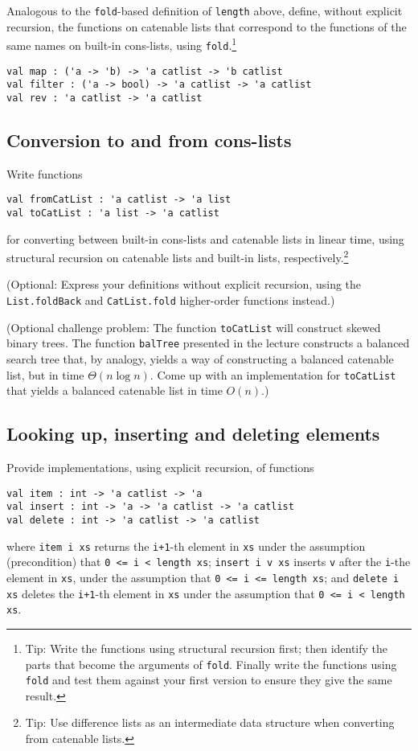 \documentclass[a4paper,11pt]{article}
\begin{document}
Analogous to the \verb|fold|-based definition of \verb|length| above, define, without explicit recursion, the functions on catenable lists that correspond to the functions of the same names on built-in cons-lists, using \verb|fold|.\footnote{Tip: Write the functions using structural recursion first; then identify the parts that become the arguments of \texttt{fold}. Finally write the functions using \texttt{fold} and test them against your first version to ensure they give the same result.}  
\begin{verbatim}
val map : ('a -> 'b) -> 'a catlist -> 'b catlist 
val filter : ('a -> bool) -> 'a catlist -> 'a catlist 
val rev : 'a catlist -> 'a catlist
\end{verbatim}

\subsection{Conversion to and from cons-lists}

Write functions
\begin{verbatim}
val fromCatList : 'a catlist -> 'a list
val toCatList : 'a list -> 'a catlist
\end{verbatim}
for converting between built-in cons-lists and catenable lists in linear time, using structural recursion on catenable lists and built-in lists, respectively.\footnote{Tip: Use difference lists as an intermediate data structure when converting from catenable lists.}

(Optional: Express your definitions without explicit recursion, using the \texttt{List.foldBack} and \texttt{CatList.fold} higher-order functions instead.)

(Optional challenge problem: The function \verb|toCatList| will construct skewed binary trees.  The function \verb|balTree| presented in the lecture constructs a balanced search tree that, by analogy, yields a way of constructing a balanced catenable list, but in time $\Theta(n \log n)$.  Come up with an implementation for \verb|toCatList| that yields a balanced catenable list in time $O(n)$.)

\subsection{Looking up, inserting and deleting elements}

Provide implementations, using explicit recursion, of functions
\begin{verbatim}
val item : int -> 'a catlist -> 'a
val insert : int -> 'a -> 'a catlist -> 'a catlist
val delete : int -> 'a catlist -> 'a catlist
\end{verbatim}
where \verb|item i xs| returns the \verb|i+1|-th element in \verb|xs| under the assumption (precondition) that \verb|0 <= i < length xs|;
\verb|insert i v xs| inserts \verb|v| after the \verb|i|-the element in \verb|xs|, under the assumption that \verb|0 <= i <= length xs|;
and \verb|delete i xs| deletes the \verb|i+1|-th element in \verb|xs| under the assumption that \verb|0 <= i < length xs|.
\end{document}
